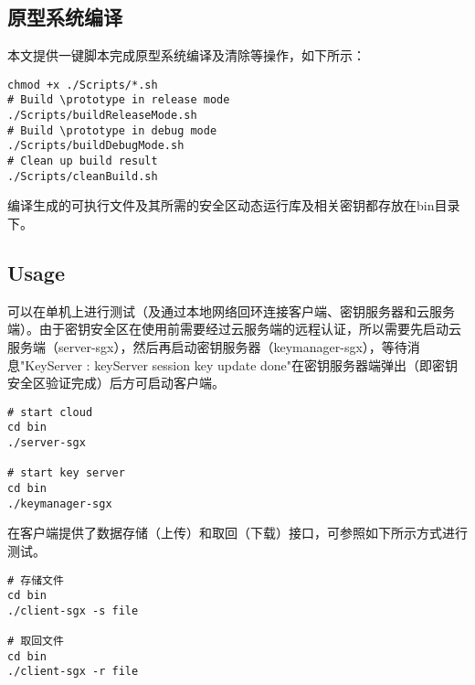 \subsection*{原型系统编译}
本文提供一键脚本完成原型系统编译及清除等操作，如下所示：

\begin{lstlisting}[style=shell]
chmod +x ./Scripts/*.sh
# Build \prototype in release mode
./Scripts/buildReleaseMode.sh
# Build \prototype in debug mode
./Scripts/buildDebugMode.sh
# Clean up build result
./Scripts/cleanBuild.sh
\end{lstlisting}

编译生成的可执行文件及其所需的安全区动态运行库及相关密钥都存放在bin目录下。

\subsection*{Usage}
\prototype 可以在单机上进行测试（及通过本地网络回环连接客户端、密钥服务器和云服务端）。由于密钥安全区在使用前需要经过云服务端的远程认证，所以需要先启动云服务端（server-sgx），然后再启动密钥服务器（keymanager-sgx），等待消息"KeyServer : keyServer session key update done"在密钥服务器端弹出（即密钥安全区验证完成）后方可启动客户端。
\begin{lstlisting}[style=shell]
# start cloud
cd bin
./server-sgx

# start key server
cd bin
./keymanager-sgx
\end{lstlisting}

\prototype 在客户端提供了数据存储（上传）和取回（下载）接口，可参照如下所示方式进行测试。

\begin{lstlisting}[style=shell]
# 存储文件
cd bin
./client-sgx -s file

# 取回文件
cd bin
./client-sgx -r file
\end{lstlisting}
